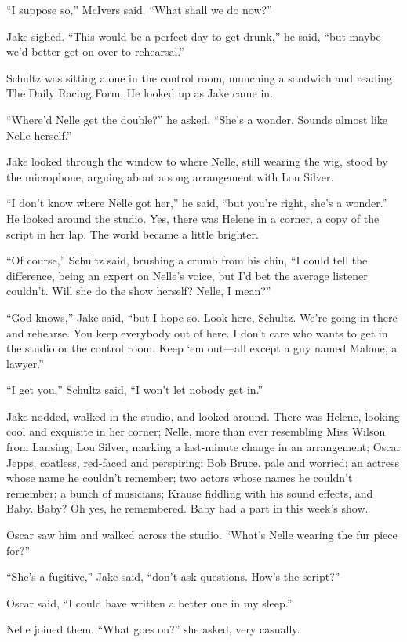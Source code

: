 \documentclass{novel}
\begin{document}
“I suppose so,” McIvers said. “What shall we do now?”

Jake sighed. “This would be a perfect day to get drunk,” he said, “but maybe we’d better get on over to rehearsal.”

Schultz was sitting alone in the control room, munching a sandwich and reading The Daily Racing Form. He looked up as Jake came in.

“Where’d Nelle get the double?” he asked. “She’s a wonder. Sounds almost like Nelle herself.”

Jake looked through the window to where Nelle, still wearing the wig, stood by the microphone, arguing about a song arrangement with Lou Silver.

“I don’t know where Nelle got her,” he said, “but you’re right, she’s a wonder.” He looked around the studio. Yes, there was Helene in a corner, a copy of the script in her lap. The world became a little brighter.

“Of course,” Schultz said, brushing a crumb from his chin, “I could tell the difference, being an expert on Nelle’s voice, but I’d bet the average listener couldn’t. Will she do the show herself? Nelle, I mean?”

“God knows,” Jake said, “but I hope so. Look here, Schultz. We’re going in there and rehearse. You keep everybody out of here. I don’t care who wants to get in the studio or the control room. Keep ‘em out—all except a guy named Malone, a lawyer.”

“I get you,” Schultz said, “I won’t let nobody get in.”

Jake nodded, walked in the studio, and looked around. There was Helene, looking cool and exquisite in her corner; Nelle, more than ever resembling Miss Wilson from Lansing; Lou Silver, marking a last-minute change in an arrangement; Oscar Jepps, coatless, red-faced and perspiring; Bob Bruce, pale and worried; an actress whose name he couldn’t remember; two actors whose names he couldn’t remember; a bunch of musicians; Krause fiddling with his sound effects, and Baby. Baby? Oh yes, he remembered. Baby had a part in this week’s show.

Oscar saw him and walked across the studio. “What’s Nelle wearing the fur piece for?”

“She’s a fugitive,” Jake said, “don’t ask questions. How’s the script?”

Oscar said, “I could have written a better one in my sleep.”

Nelle joined them. “What goes on?” she asked, very casually.
\end{document}
